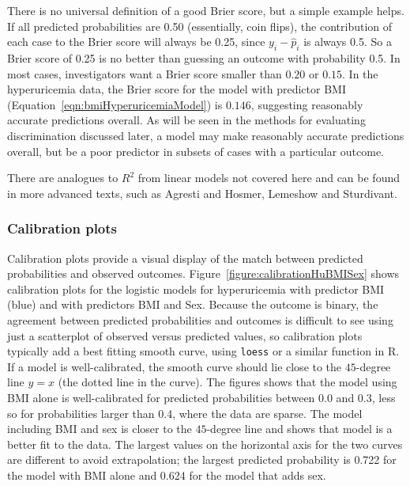 There is no universal definition of a good Brier score, but a simple example helps.  If all predicted probabilities are 0.50 (essentially, coin flips), the contribution of each case to the Brier score will always be 0.25, since $y_i - \hat{p}_i$ is always 0.5.  So a Brier score of 0.25 is no better than guessing an outcome with probability 0.5.  In most cases, investigators want a Brier score smaller than $0.20$ or $0.15$.  In the hyperuricemia data, the Brier score for the model with predictor BMI (Equation~\ref{eqn:bmiHyperuricemiaModel}) is $0.146$, suggesting reasonably accurate predictions overall.  As will be seen in the methods for evaluating discrimination discussed later,  a model may make reasonably accurate predictions overall, but be a poor predictor in subsets of cases with a particular outcome.

There are analogues to $R^2$ from linear models not covered here and can be found in more advanced texts, such as Agresti and Hosmer, Lemeshow and Sturdivant.

\subsubsection{Calibration plots}

Calibration plots provide a visual display of the match between predicted probabilities and observed outcomes.  Figure~\ref{figure:calibrationHuBMISex} shows calibration plots for the logistic models for hyperuricemia with predictor BMI (blue) and with predictors BMI and Sex.  Because the outcome is binary, the agreement between predicted probabilities and outcomes is difficult to see using just a scatterplot of observed versus predicted values, so calibration plots typically add a best fitting smooth curve, using \texttt{loess} or a similar function in \textsf{R}.  If a model is well-calibrated, the smooth curve should lie close to the $45$-degree line $y = x$ (the dotted line in the curve).  The figures shows that the model using BMI alone is well-calibrated for predicted probabilities between 0.0 and 0.3, less so for probabilities larger than 0.4, where the data are sparse.  The model including BMI and sex is closer to the $45$-degree line and shows that model is a better fit to the data.  The largest values on the horizontal axis for the two curves are different to avoid extrapolation; the largest predicted probability is 0.722 for the model with BMI alone and 0.624 for the model that adds sex.

